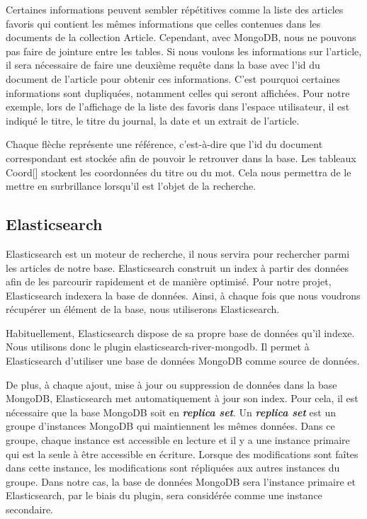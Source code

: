 Certaines informations peuvent sembler répétitives comme la liste des articles favoris qui contient les mêmes informations que celles contenues dans les documents de la collection Article. Cependant, avec MongoDB, nous ne pouvons pas faire de jointure entre les tables. Si nous voulons les informations sur l’article, il sera nécessaire de faire une deuxième requête dans la base avec l’id du document de l’article pour obtenir ces informations. C’est pourquoi certaines informations sont dupliquées, notamment celles qui seront affichées. Pour notre exemple, lors de l’affichage de la liste des favoris dans l’espace utilisateur, il est indiqué le titre, le titre du journal, la date et un extrait de l’article. 


Chaque flèche représente une référence, c’est-à-dire que l’id du document correspondant est stockée afin de pouvoir le retrouver dans la base. Les tableaux Coord[] stockent les coordonnées du  titre ou du mot. Cela nous permettra de le mettre en surbrillance lorsqu’il est l’objet de la recherche. 

\subsection{Elasticsearch}

Elasticsearch est un moteur de recherche, il nous servira pour rechercher parmi les articles de notre base. Elasticsearch construit un index à partir des données afin de les parcourir rapidement et de manière optimisé. Pour notre projet, Elasticsearch indexera la base de données. Ainsi, à chaque fois que nous voudrons récupérer un élément de la base, nous utiliserons Elasticsearch. 


Habituellement, Elasticsearch dispose de sa propre base de données qu’il indexe. Nous utilisons donc le plugin elasticsearch-river-mongodb\cite{GitRiver}. Il permet à Elasticsearch d’utiliser une base de données MongoDB comme source de données. 


De plus, à chaque ajout, mise à jour ou suppression de données dans la base MongoDB, Elasticsearch met automatiquement à jour son index. Pour cela, il est nécessaire que la base MongoDB soit en \textbf{\textit{replica set}}.  Un \textbf{\textit{replica set}} est un groupe d’instances MongoDB qui maintiennent les mêmes données. Dans ce groupe, chaque instance est accessible en lecture et il y a une instance primaire qui est la seule à être accessible en écriture. Lorsque des modifications sont faîtes dans cette instance, les modifications sont répliquées aux autres instances du groupe. Dans notre cas, la base de données MongoDB sera l’instance primaire et Elasticsearch, par le biais du plugin, sera considérée comme une instance secondaire.


